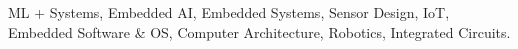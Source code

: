 \noindent
ML + Systems, Embedded AI, Embedded Systems, Sensor Design, IoT, Embedded Software \& OS, Computer Architecture, Robotics, Integrated Circuits.


